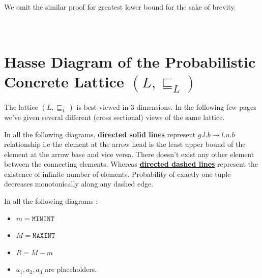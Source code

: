 \documentclass[final,3p, review, times]{Elsevier/elsarticle}
\begin{document}
We omit the similar proof for greatest lower bound for the sake of brevity.










\newpage
\section{\\Hasse Diagram of the Probabilistic Concrete Lattice $(L,\sqsubseteq_L)$}
\label{app:concrete_hasse}

The lattice $(L,\sqsubseteq_L)$ is best viewed in 3 dimensions. In the following few pages we've given several different (cross sectional) views of the same lattice.

In all the following diagrams, \underline{\textbf{directed solid lines}} represent $g.l.b\to l.u.b$ relationship i.e the element at the arrow head is the least upper bound of the element at the arrow base and vice versa. There doesn't exist any other element between the connecting elements. Whereas \underline{\textbf{directed dashed lines}} represent the existence of infinite number of elements. Probability of exactly one tuple decreases monotonically along any dashed edge.

In all the following diagrams :
\begin{itemize}
  \item $m=\mathtt{MININT}$
  \item $M=\mathtt{MAXINT}$
  \item $R=M-m$
  \item $a_1,a_2,a_3$ are placeholders.
\end{itemize}
\end{document}
